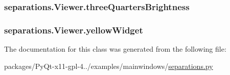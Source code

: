 \subsubsection[{three\+Quarters\+Brightness}]{\setlength{\rightskip}{0pt plus 5cm}separations.\+Viewer.\+three\+Quarters\+Brightness}\label{classseparations_1_1Viewer_a3672a73249ba93bd9188a3cb76bd964f}
\hypertarget{classseparations_1_1Viewer_a5714b4ad9ff54d49f7abc7f511735e61}{}
\subsubsection[{yellow\+Widget}]{\setlength{\rightskip}{0pt plus 5cm}separations.\+Viewer.\+yellow\+Widget}\label{classseparations_1_1Viewer_a5714b4ad9ff54d49f7abc7f511735e61}


The documentation for this class was generated from the following file\+:\begin{DoxyCompactItemize}
\item 
packages/\+Py\+Qt-\/x11-\/gpl-\/4../examples/mainwindows/\hyperlink{separations_8py}{separations.\+py}\end{DoxyCompactItemize}

